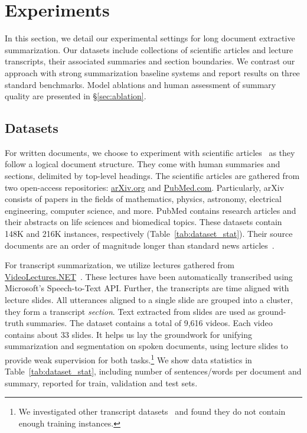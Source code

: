\documentclass[11pt]{article}
\begin{document}
\section{Experiments}
\label{sec:expr}



In this section, we detail our experimental settings for long document extractive summarization.
Our datasets include collections of scientific articles and lecture transcripts, 
their associated summaries and section boundaries. 
We contrast our approach with strong summarization baseline systems and report results on three standard benchmarks.
Model ablations and human assessment of summary quality are presented in \S\ref{sec:ablation}. 


\subsection{Datasets}

For written documents, we choose to experiment with scientific articles~\cite{cohan-etal-2018-discourse} as they follow a logical document structure.
They come with human summaries and sections, delimited by top-level headings.
The scientific articles are gathered from two open-access repositories: \href{arXiv.org}{arXiv.org} and \href{PubMed.com}{PubMed.com}.
Particularly, arXiv consists of papers in the fields of mathematics, physics, astronomy, electrical engineering, computer science, and more.
PubMed contains research articles and their abstracts on life sciences and biomedical topics.
These datasets contain 148K and 216K instances, respectively (Table~\ref{tab:dataset_stat}). 
Their source documents are an order of magnitude longer than standard news articles~\cite{grusky-etal-2018-newsroom}.


For transcript summarization, we utilize lectures gathered from \href{VideoLectures.NET}{VideoLectures.NET}~\cite{lv2021vt}.
These lectures have been automatically transcribed using Microsoft's Speech-to-Text API. 
Further, the transcripts are time aligned with lecture slides.
All utterances aligned to a single slide are grouped into a cluster, they form a transcript \emph{section}.
Text extracted from slides are used as ground-truth summaries. 
The dataset contains a total of 9,616 videos.
Each video contains about 33 slides.
It helps us lay the groundwork for unifying summarization and segmentation on spoken documents, 
using lecture slides to provide weak supervision for both tasks.\footnote{
We investigated other transcript datasets~\cite{Carletta:2006} and found they do not contain enough training instances.
}
We show data statistics in Table~\ref{tab:dataset_stat},
including number of sentences/words per document and summary,
reported for train, validation and test sets.
\end{document}

